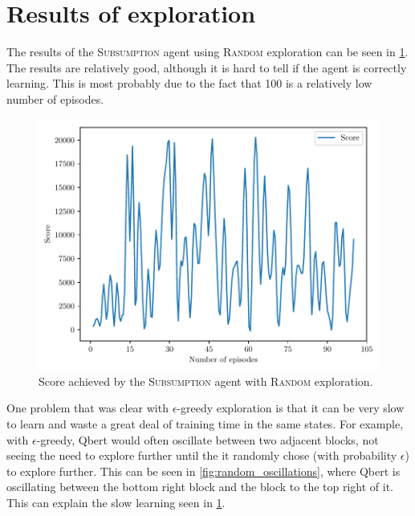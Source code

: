 \documentclass[a4paper,titlepage]{article}
\begin{document}
	\section{Results of exploration}
	
	The results of the \textsc{Subsumption} agent using \textsc{Random} exploration can be seen in \cref{fig:subsumption_random}. The results are relatively good, although it is hard to tell if the agent is correctly learning. This is most probably due to the fact that 100 is a relatively low number of episodes.
	
	\begin{figure}[!htb]
		\centering
		\includegraphics[width=\columnwidth]{plots/subsumption_random.pdf}
		\caption
		{Score achieved by the \textsc{Subsumption} agent with \textsc{Random} exploration.}
		\label{fig:subsumption_random}
	\end{figure}
	
	One problem that was clear with $\epsilon$-greedy exploration is that it can be very slow to learn and waste a great deal of training time in the same states. For example, with $\epsilon$-greedy, Qbert would often oscillate between two adjacent blocks, not seeing the need to explore further until the it randomly chose (with probability $\epsilon$) to explore further. This can be seen in \cref{fig:random_oscillations}, where Qbert is oscillating between the bottom right block and the block to the top right of it. This can explain the slow learning seen in \cref{fig:subsumption_random}.
\end{document}
